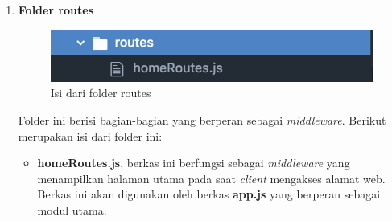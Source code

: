 \begin{enumerate}
\begin{enumerate}
\begin{enumerate}
			\item \textbf{gamePlayMobileStyle.css}, Berkas ini berfungsi untuk menghias halaman permainan pada \textit{mobile browser}.
			
			\item \textbf{homeStyle.css}, Berkas ini berfungsi untuk menghias halaman utama pada \textit{PC browser} dan \textit{mobile browser}.
			
			\item \textbf{mobileStyle.css}, Berkas ini berfungsi untuk menghias halaman proses permintaan koneksi pada \textit{mobile browser}.
			
			\item \textbf{Nickname\_DEMO.otf\footnote{\url{http://pizzadude.dk/site/fonts/nickname}, diakses 12 September 2018}}, Berkas ini berfungsi sebagai tipe \textit{font} yang digunakan di beberapa halaman yang terdapat pada web.
			
			\item \textbf{syncStyle.css}, Berkas ini berfungsi untuk menghias halaman proses permintaan koneksi pada \textit{PC browser}.
			
			\item \textbf{winningDesktopStyle.css}, Berkas ini berfungsi untuk menghias halaman saat permainan telah selesai pada \textit{mobile browser}.
			
			\item \textbf{winningMobileStyle.css}, Berkas ini berfungsi untuk menghias halaman saat permainan telah selesai pada \textit{mobile browser}.
			
			
		\end{enumerate}
	\end{enumerate}
	
	\item \textbf{Folder routes} \\
	
	\begin{figure}[H]
		\centering
		\includegraphics[scale=0.4]{Gambar/direktori_routes}
		\caption{Isi dari folder routes}
		\label{fig:direktori_routes}
	\end{figure}
	
	Folder ini berisi bagian-bagian yang berperan sebagai \textit{middleware}. Berikut merupakan isi dari folder ini:
	\begin{itemize}
		\item \textbf{homeRoutes.js}, berkas ini berfungsi sebagai \textit{middleware} yang menampilkan halaman utama pada saat \textit{client} mengakses alamat web. Berkas ini akan digunakan oleh berkas \textbf{app.js} yang berperan sebagai modul utama.
	\end{itemize}


\end{enumerate}
